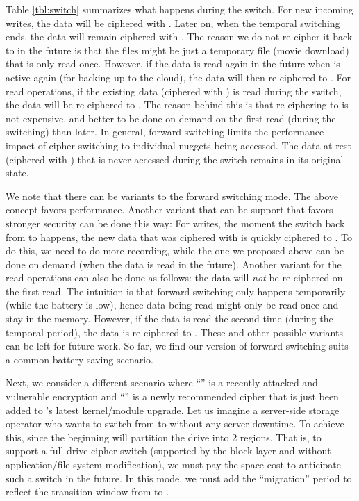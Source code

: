 Table \cref{tbl:switch} summarizes what happens during the switch. For new
incoming writes, the data will be ciphered with \ctwo. Later on, when the
temporal switching ends, the data will remain ciphered with \ctwo
{}. The reason we do not re-cipher it back to \cone in the future is
that the files might be just a temporary file (\eg movie download) that is only
read once. However, if the data is read again in the future when \cone is active
again (\eg for backing up to the cloud), the data will then re-ciphered to
\cone. For read operations, if the existing data (ciphered with \cone) is read
during the switch, the data will be re-ciphered to \ctwo. The reason behind this
is that re-ciphering to \ctwo is not expensive, and better to be done on demand
on the first read (during the switching) than later. In general, forward
switching limits the performance impact of cipher switching to individual
nuggets being accessed. The data at rest (ciphered with \cone) that is never
accessed during the switch remains in its original state.

We note that there can be variants to the forward switching mode. The above
concept favors performance. Another variant that can be support that favors
stronger security can be done this way: For writes, the moment the switch back
from \ctwo to \cone happens, the new data that was ciphered with \ctwo is
quickly ciphered to \cone. To do this, we need to do more recording, while the
one we proposed above can be done on demand (when the data is read in the
future). Another variant for the read operations can also be done as follows:
the data will {\em not} be re-ciphered on the first read. The intuition is that
forward switching only happens temporarily (while the battery is low), hence
data being read might only be read once and stay in the memory. However, if the
data is read the second time (during the temporal period), the data is
re-ciphered to \ctwo. These and other possible variants can be left for future
work. So far, we find our version of forward switching suits a common
battery-saving scenario.



 Next, we consider a different scenario where
``\cone'' is a recently-attacked and vulnerable encryption and ``\ctwo'' is a
newly recommended cipher that is just been added to \sys's latest kernel/module
upgrade. Let us imagine a server-side storage operator who wants to switch from
\cone to \ctwo without any server downtime. To achieve this, \sys since the
beginning will partition the drive into 2 regions. That is, to support a
full-drive cipher switch (supported by the block layer and without
application/file system modification), we must pay the space cost to anticipate
such a switch in the future. In this mode, we must add the ``migration'' period
to reflect the transition window from \cone to \ctwo.

